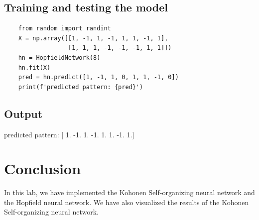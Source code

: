 \subsection{Training and testing the model}
\begin{verbatim}
    from random import randint
    X = np.array([[1, -1, 1, -1, 1, 1, -1, 1],
                  [1, 1, 1, -1, -1, -1, 1, 1]])
    hn = HopfieldNetwork(8)
    hn.fit(X)
    pred = hn.predict([1, -1, 1, 0, 1, 1, -1, 0])
    print(f'predicted pattern: {pred}')
\end{verbatim}
\subsection{Output}
predicted pattern: [ 1. -1.  1. -1.  1.  1. -1.  1.]


\section{Conclusion}
In this lab, we have implemented the Kohonen Self-organizing neural network and the Hopfield neural network. We have also visualized the results of the Kohonen Self-organizing neural network.\\





